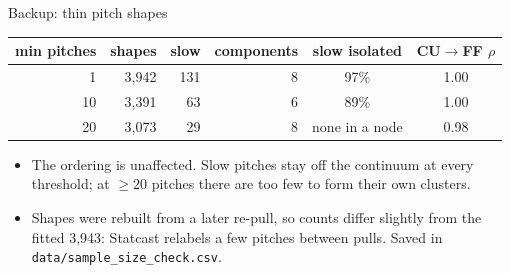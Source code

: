 \documentclass[aspectratio=169]{beamer}
\begin{document}
\begin{frame}{Backup: thin pitch shapes}
\small
\begin{tabular}{@{}rrrrcc@{}}
\toprule
min pitches & shapes & slow & components & slow isolated & CU$\to$FF $\rho$ \\
\midrule
1 & 3{,}942 & 131 & 8 & 97\% & 1.00 \\
10 & 3{,}391 & 63 & 6 & 89\% & 1.00 \\
20 & 3{,}073 & 29 & 8 & none in a node & 0.98 \\
\bottomrule
\end{tabular}
\vspace{6pt}
\begin{itemize}\small
  \item The ordering is unaffected. Slow pitches stay off the continuum at every threshold; at $\ge 20$ pitches there are too few to form their own clusters.
  \item Shapes were rebuilt from a later re-pull, so counts differ slightly from the fitted 3{,}943: Statcast relabels a few pitches between pulls. Saved in \texttt{data/sample\_size\_check.csv}.
\end{itemize}
\end{frame}
\end{document}

